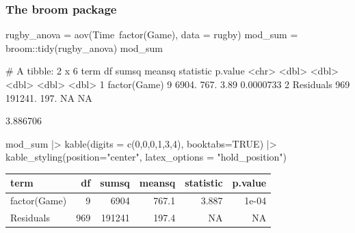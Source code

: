 \documentclass[a4paper]{article}
\begin{document}
\subsubsection{The broom package}
\begin{Schunk}
\begin{Sinput}
rugby_anova = aov(Time~factor(Game), data = rugby)
mod_sum = broom::tidy(rugby_anova)
mod_sum
\end{Sinput}
\begin{Soutput}
# A tibble: 2 x 6
  term            df   sumsq meansq statistic    p.value
  <chr>        <dbl>   <dbl>  <dbl>     <dbl>      <dbl>
1 factor(Game)     9   6904.   767.      3.89  0.0000733
2 Residuals      969 191241.   197.     NA    NA        
\end{Soutput}
\begin{Soutput}
[1] 3.886706
\end{Soutput}
\begin{Sinput}
mod_sum |> kable(digits = c(0,0,0,1,3,4), booktabs=TRUE) |>
  kable_styling(position="center", latex_options = "hold_position")
\end{Sinput}
\begin{table}[!h]
\centering
\begin{tabular}{lrrrrr}
\toprule
term & df & sumsq & meansq & statistic & p.value\\
\midrule
factor(Game) & 9 & 6904 & 767.1 & 3.887 & 1e-04\\
Residuals & 969 & 191241 & 197.4 & NA & NA\\
\bottomrule
\end{tabular}
\end{table}

\end{Schunk}
\end{document}
